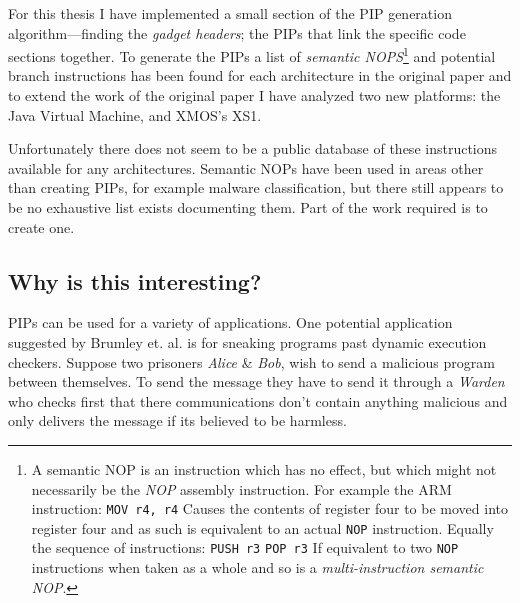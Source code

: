 For this thesis I have implemented a small section of the PIP generation
algorithm---finding the \emph{gadget headers}; the PIPs that link the
specific code sections together. To generate the PIPs a list of
\emph{semantic NOPS}\footnote{A semantic NOP is an instruction which has
  no effect, but which might not necessarily be the \emph{NOP} assembly
  instruction. For example the ARM instruction: \lstinline!MOV r4, r4!
  Causes the contents of register four to be moved into register four
  and as such is equivalent to an actual \lstinline!NOP! instruction.
  Equally the sequence of instructions: \lstinline!PUSH r3!
  \lstinline!POP r3! If equivalent to two \lstinline!NOP! instructions
  when taken as a whole and so is a \emph{multi-instruction semantic
  NOP}.} and potential branch instructions has been found for each
architecture in the original paper and to extend the work of the
original paper I have analyzed two new platforms: the Java Virtual
Machine, and XMOS's XS1.

Unfortunately there does not seem to be a public database of these
instructions available for any architectures. Semantic NOPs have been
used in areas other than creating PIPs, for example malware
classification\citep{Bilar2007}\citep{Preda2007}, but there still
appears to be no exhaustive list exists documenting them. Part of the
work required is to create one.

\subsection{Why is this interesting?}

PIPs can be used for a variety of applications. One potential
application suggested by Brumley et. al.\citep{Brumley2010} is for
sneaking programs past dynamic execution checkers. Suppose two prisoners
\emph{Alice} \& \emph{Bob}, wish to send a malicious program between
themselves. To send the message they have to send it through a
\emph{Warden} who checks first that there communications don't contain
anything malicious and only delivers the message if its believed to be
harmless.


